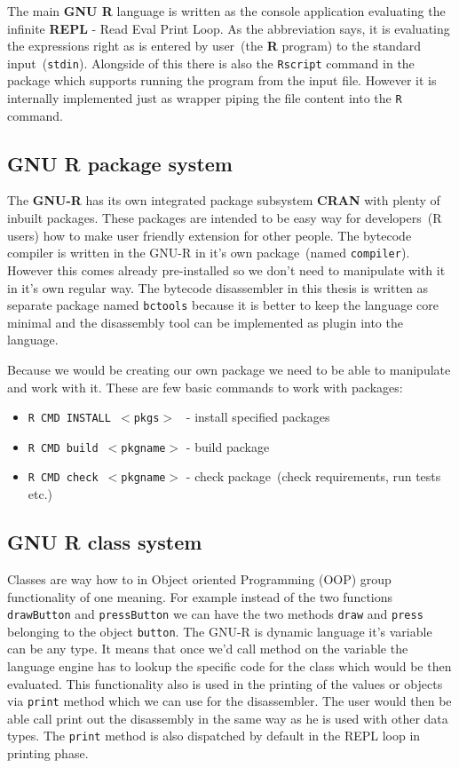 \documentclass[thesis=M,english]{FITthesis}[2018/10/20]
\newcommand{\code}[1]{\texttt{#1}}
\begin{document}
The main \textbf{GNU R} language is written as the console application evaluating the infinite \textbf{REPL} - Read Eval Print Loop. As the abbreviation says, it is evaluating the expressions right as is entered by user~(the \textbf{R} program) to the standard input~(\code{stdin}). Alongside of this there is also the \code{Rscript} command in the package which supports running the program from the input file. However it is internally implemented just as wrapper piping the file content into the \code{R} command. 

\subsection{GNU R package system}\label{R-Packages}

The \textbf{GNU-R} has its own integrated package subsystem \textbf{CRAN} with plenty of inbuilt packages. These packages are intended to be easy way for developers~(R users) how to make user friendly extension for other people. The bytecode compiler is written in the GNU-R in it's own package~(named \code{compiler}). However this comes already pre-installed so we don't need to manipulate with it in it's own regular way. The bytecode disassembler in this thesis is written as separate package named \code{bctools} because it is better to keep the language core minimal and the disassembly tool can be implemented as plugin into the language.

Because we would be creating our own package we need to be able to manipulate and work with it. These are few basic commands to work with packages:

\begin{itemize}
	\item \code{R CMD INSTALL $<$pkgs$>$ } - install specified packages
	\item \code{R CMD build $<$pkgname$>$} - build package
	\item \code{R CMD check $<$pkgname$>$} - check package~(check requirements, run tests etc.)
\end{itemize}



\subsection{GNU R class system}\label{R-Classes}

Classes are way how to in Object oriented Programming (OOP) group functionality of one meaning. For example instead of the two functions \code{drawButton} and \code{pressButton} we can have the two methods \code{draw} and \code{press} belonging to the object \code{button}. The GNU-R is dynamic language it's variable can be any type. It means that once we'd call method on the variable the language engine has to lookup the specific code for the class which would be then evaluated. This functionality also is used in the printing of the values or objects via \code{print} method which we can use for the disassembler. The user would then be able call print out the disassembly in the same way as he is used with other data types. The \code{print} method is also dispatched by default in the REPL loop in printing phase.
\end{document}
